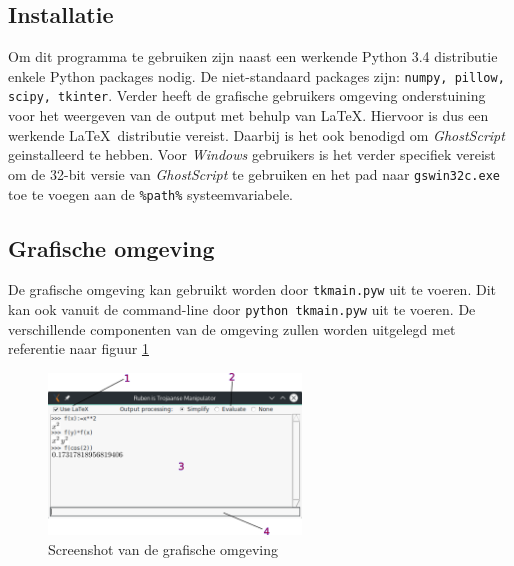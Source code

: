 \documentclass[a4paper]{article}
\begin{document}
\subsection{Installatie}
Om dit programma te gebruiken zijn naast een werkende Python 3.4 distributie enkele Python packages nodig. De niet-standaard packages zijn: \texttt{numpy, pillow, scipy, tkinter}.
Verder heeft de grafische gebruikers omgeving onderstuining voor het weergeven van de output met behulp van \LaTeX. Hiervoor is dus een werkende \LaTeX~distributie vereist. Daarbij is het ook benodigd om \emph{GhostScript} geinstalleerd te hebben. Voor \emph{Windows} gebruikers is het verder specifiek vereist om de 32-bit versie van \emph{GhostScript} te gebruiken en het pad naar \texttt{gswin32c.exe} toe te voegen aan de \texttt{\%path\%} systeemvariabele.

\subsection{Grafische omgeving}
De grafische omgeving kan gebruikt worden door \texttt{tkmain.pyw} uit te voeren. Dit kan ook vanuit de command-line door \texttt{python tkmain.pyw} uit te voeren.  De verschillende componenten van de omgeving zullen worden uitgelegd met referentie naar figuur \ref{fig:screenshot}

\begin{figure}[!htb]
  \centering
  \includegraphics[width=0.6\textwidth]{screenshot.png}
  \caption{Screenshot van de grafische omgeving}
  \label{fig:screenshot}
\end{figure}
\end{document}
